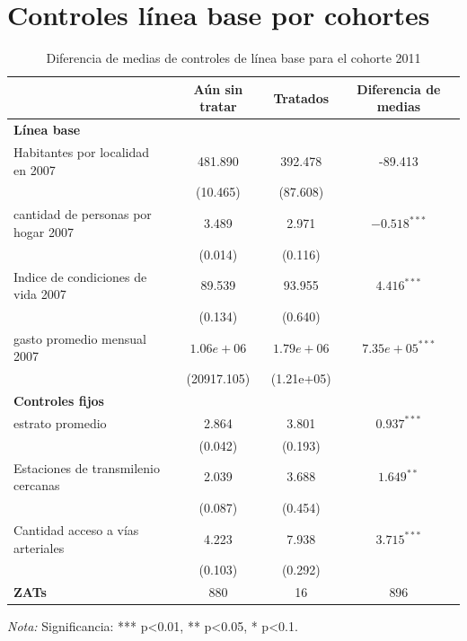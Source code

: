 \documentclass{article}
\begin{document}
\appendix
{}

\section{Controles línea base por cohortes}
\label{sec:controles_linea_base}

\begin{table} [H]
  \centering
  \caption{Diferencia de medias de controles de línea base para el cohorte 2011}
  \label{tab:comparacion_2011}
  \begin{tabular}{l c c c}
    \toprule
    & \textbf{Aún sin tratar} & \textbf{Tratados} & \textbf{Diferencia de medias} \\
    \midrule
    \multicolumn{4}{l}{\textbf{Línea base}} \\
    \midrule
    Habitantes por localidad en 2007 & 481.890 & 392.478 & -89.413 \\
    & (10.465) & (87.608) & \\
    cantidad de personas por hogar 2007 & 3.489 & 2.971 & $-0.518^{***}$ \\
    & (0.014) & (0.116) & \\
    Indice de condiciones de vida 2007 & 89.539 & 93.955 & $4.416^{***}$ \\
    & (0.134) & (0.640) & \\
    gasto promedio mensual 2007 & $1.06e+06$ & $1.79e+06$ & $7.35e+05^{***}$ \\
    & (20917.105) & (1.21e+05) & \\
    \midrule
    \multicolumn{4}{l}{\textbf{Controles fijos}} \\
    \midrule
    estrato promedio & 2.864 & 3.801 & $0.937^{***}$ \\
    & (0.042) & (0.193) & \\
    Estaciones de transmilenio cercanas & 2.039 & 3.688 & $1.649^{**}$ \\
    & (0.087) & (0.454) & \\
    Cantidad acceso a vías arteriales & 4.223 & 7.938 & $3.715^{***}$ \\
    & (0.103) & (0.292) & \\
    \midrule
    \textbf{ZATs} & 880 & 16 & 896 \\
    \bottomrule
  \end{tabular}
  \parbox[t]{\textwidth}{%
    \vspace{0.5em}
    \footnotesize{ \textit{Nota:} Significancia: *** p<0.01, ** p<0.05, * p<0.1.}}
\end{table}
\end{document}
